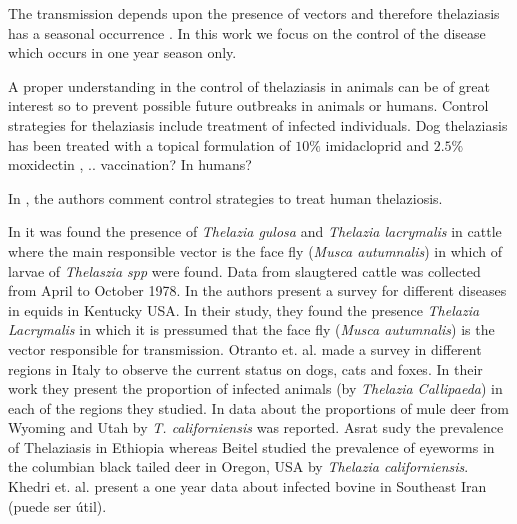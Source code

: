 \documentclass[preprint,12pt]{elsarticle}
\begin{document}
        The transmission depends upon the presence of vectors and therefore
    thelaziasis has a seasonal occurrence \cite{Asrat:2016}. In this work we
    focus on the control of the disease which occurs in one year season only.

        A proper understanding in the control of thelaziasis in animals can 
    be of great interest so to prevent possible future outbreaks in animals or 
    humans. Control strategies for thelaziasis include treatment of infected 
    individuals. Dog thelaziasis has been treated with a topical formulation of 
    $10\%$ imidacloprid and $2.5\%$ moxidectin \cite{Bianciardi:2005},
    ..
    vaccination? In humans?

        In \cite{shen:2006}, the authors comment control strategies to treat 
        human thelaziosis.




        In \cite{Moolenbeek:1980} it was found the presence of 
    \textit{Thelazia gulosa} and \textit{Thelazia lacrymalis} in cattle where
    the main responsible vector is the face fly (\textit{Musca autumnalis}) in
    which of larvae of \textit{Thelaszia spp} were found. Data from slaugtered
    cattle was collected from April to October 1978. In \cite{Lyons:2000} the
    authors present a survey for different diseases in equids in Kentucky USA.
    In their study, they found the presence \textit{Thelazia Lacrymalis} in
    which it is pressumed that the face fly (\textit{Musca autumnalis}) is the
    vector responsible for transmission. Otranto et. al. \cite{Otranto:2003}
    made a survey in different regions in Italy to observe the current status on
    dogs, cats and foxes. In their work they present the proportion of infected
    animals (by \textit{Thelazia Callipaeda}) in each of the regions they
    studied. In \cite{Dubay:2000} data about the proportions of mule deer from
    Wyoming and Utah by \textit{T. californiensis} was reported. Asrat
    \cite{Asrat:2016} sudy the prevalence of Thelaziasis in Ethiopia whereas
    Beitel \cite{Beitel:1974} studied the prevalence of eyeworms in the
    columbian black tailed deer in Oregon, USA by \textit{Thelazia
    californiensis}. Khedri et. al. \cite{Khedri:2016} present a one year data
    about infected bovine in Southeast Iran (puede ser útil).
\end{document}
